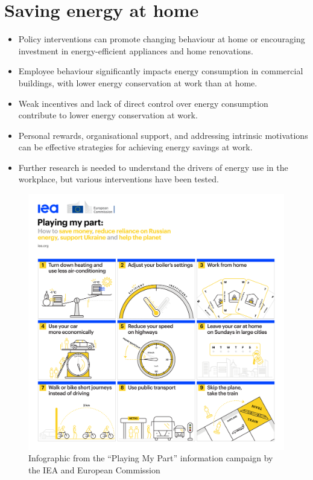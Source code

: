 \documentclass[
  11pt,
]{article}
\begin{document}
\hypertarget{sec:home}{%
\section{Saving energy at home}\label{sec:home}}

\begin{keypoints}
\begin{itemize}[leftmargin=*,labelsep=5mm]
    \item Policy interventions can promote changing behaviour at home or encouraging investment in energy-efficient appliances and home renovations.
    \item Employee behaviour significantly impacts energy consumption in commercial buildings, with lower energy conservation at work than at home.
    \item Weak incentives and lack of direct control over energy consumption contribute to lower energy conservation at work.
    \item Personal rewards, organisational support, and addressing intrinsic motivations can be effective strategies for achieving energy savings at work.
    \item Further research is needed to understand the drivers of energy use in the workplace, but various interventions have been tested.
\end{itemize}
\end{keypoints}

\begin{figure}
\centering
\includegraphics{Images/playingmypart-infographic.png}
\caption{Infographic from the ``Playing My Part'' information campaign
by the IEA and European Commission}
\end{figure}
\end{document}
